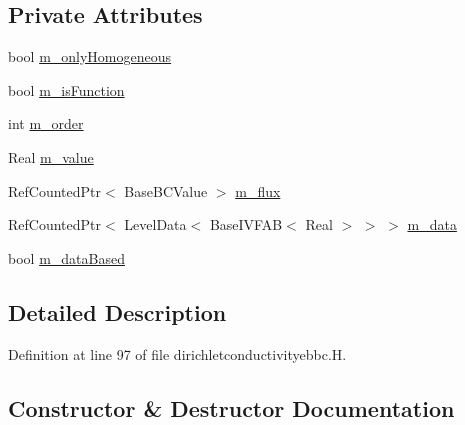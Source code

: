\subsection*{Private Attributes}
\begin{DoxyCompactItemize}
\item 
bool \hyperlink{classdirichletconductivityebbcfactory_adbdd77db78d43e00b5f940e8d6bb334f}{m\+\_\+only\+Homogeneous}
\item 
bool \hyperlink{classdirichletconductivityebbcfactory_aa07bdc73058d817faf3b32526657ecee}{m\+\_\+is\+Function}
\item 
int \hyperlink{classdirichletconductivityebbcfactory_abb1928dc2e08dee7c27327904ce1b354}{m\+\_\+order}
\item 
Real \hyperlink{classdirichletconductivityebbcfactory_a057d4ad213c131c82f616bf5f8ef925a}{m\+\_\+value}
\item 
Ref\+Counted\+Ptr$<$ Base\+B\+C\+Value $>$ \hyperlink{classdirichletconductivityebbcfactory_a203c4be2676de21b8ba065a5ad23655e}{m\+\_\+flux}
\item 
Ref\+Counted\+Ptr$<$ Level\+Data$<$ Base\+I\+V\+F\+AB$<$ Real $>$ $>$ $>$ \hyperlink{classdirichletconductivityebbcfactory_a921ac6b177f4e1c5b5800ef01c61f6c6}{m\+\_\+data}
\item 
bool \hyperlink{classdirichletconductivityebbcfactory_a2838c8447e0579d4ebb080d658fdd2cf}{m\+\_\+data\+Based}
\end{DoxyCompactItemize}


\subsection{Detailed Description}


Definition at line 97 of file dirichletconductivityebbc.\+H.



\subsection{Constructor \& Destructor Documentation}
